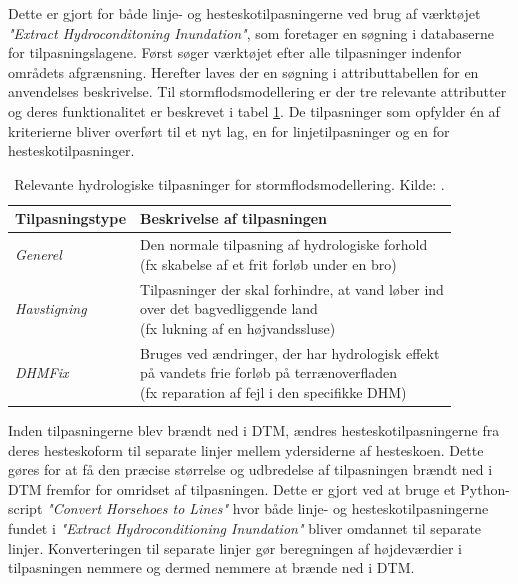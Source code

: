 Dette er gjort for både linje- og hesteskotilpasningerne ved brug af værktøjet \textit{"Extract Hydroconditoning Inundation"}, som foretager en søgning i databaserne for tilpasningslagene. Først søger værktøjet efter alle tilpasninger indenfor områdets afgrænsning. Herefter laves der en søgning i attributtabellen for en anvendelses beskrivelse. Til stormflodsmodellering er der tre relevante attributter og deres funktionalitet er beskrevet i tabel \ref{Tabel: Relevante hydrologiske tilpasninger}. De tilpasninger som opfylder én af kriterierne bliver overført til et nyt lag, en for linjetilpasninger og en for hesteskotilpasninger. 
\begin{table}[H]
\centering
\renewcommand{\arraystretch}{1.5}
\begin{threeparttable}
\caption{Relevante hydrologiske tilpasninger for stormflodsmodellering. Kilde: \cite{GeoDanmark_HydroLag}.}
\label{Tabel: Relevante hydrologiske tilpasninger}
\begin{tabular}{@{} l l @{}} 
\toprule
\textbf{Tilpasningstype} & \textbf{Beskrivelse af tilpasningen} \\
\midrule
\textit{Generel} &
  \makecell[l]{Den normale tilpasning af hydrologiske forhold\\
  (fx skabelse af et frit forløb under en bro)} \\
\addlinespace
\textit{Havstigning} &
  \makecell[l]{Tilpasninger der skal forhindre, at vand løber ind\\
  over det bagvedliggende land\\
  (fx lukning af en højvandssluse)} \\
\addlinespace
\textit{DHMFix} &
  \makecell[l]{Bruges ved ændringer, der har hydrologisk effekt\\
  på vandets frie forløb på terrænoverfladen\\
  (fx reparation af fejl i den specifikke DHM)} \\
\bottomrule
\end{tabular}
\end{threeparttable}
\end{table}
\newpage
Inden tilpasningerne blev brændt ned i DTM, ændres hesteskotilpasningerne fra deres hesteskoform til separate linjer mellem ydersiderne af hesteskoen. Dette gøres for at få den præcise størrelse og udbredelse af tilpasningen brændt ned i DTM fremfor for omridset af tilpasningen. Dette er gjort ved at bruge et Python-script \textit{"Convert Horsehoes to Lines"} hvor både linje- og hesteskotilpasningerne fundet i \textit{"Extract Hydroconditioning Inundation"} bliver omdannet til separate linjer. Konverteringen til separate linjer gør beregningen af højdeværdier i tilpasningen nemmere og dermed nemmere at brænde ned i DTM.\\
